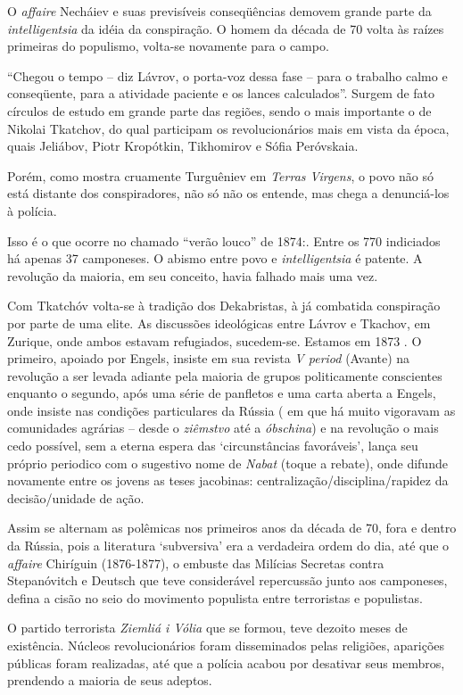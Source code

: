 O \emph{affaire} Necháiev e suas previsíveis conseqüências demovem
grande parte da \emph{intelligentsia} da idéia da conspiração. O homem
da década de 70 volta às raízes primeiras do populismo, volta-se
novamente para o campo.

``Chegou o tempo -- diz Lávrov, o porta-voz dessa fase -- para o
trabalho calmo e conseqüente, para a atividade paciente e os lances
calculados''. Surgem de fato círculos de estudo em grande parte das
regiões, sendo o mais importante o de Nikolai Tkatchov, do qual
participam os revolucionários mais em vista da época, quais Jeliábov,
Piotr Kropótkin, Tikhomirov e Sófia Peróvskaia.

Porém, como mostra cruamente Turguêniev em \emph{Terras Virgens}, o povo
não só está distante dos conspiradores, não só não os entende, mas chega
a denunciá-los à polícia.

Isso é o que ocorre no chamado ``verão louco'' de 1874:. Entre os 770
indiciados há apenas 37 camponeses. O abismo entre povo e
\emph{intelligentsia} é patente. A revolução da maioria, em seu
conceito, havia falhado mais uma vez.

Com Tkatchóv volta-se à tradição dos Dekabristas, à já combatida
conspiração por parte de uma elite. As discussões ideológicas entre
Lávrov e Tkachov, em Zurique, onde ambos estavam refugiados, sucedem-se.
Estamos em 1873 . O primeiro, apoiado por Engels, insiste em sua revista
\emph{V period} (Avante) na revolução a ser levada adiante pela maioria
de grupos politicamente conscientes enquanto o segundo, após uma série
de panfletos e uma carta aberta a Engels, onde insiste nas condições
particulares da Rússia ( em que há muito vigoravam as comunidades
agrárias -- desde o \emph{ziêmstvo} até a \emph{óbschina}) e na
revolução o mais cedo possível, sem a eterna espera das `circunstâncias
favoráveis', lança seu próprio periodico com o sugestivo nome de
\emph{Nabat} (toque a rebate), onde difunde novamente entre os jovens as
teses jacobinas: centralização/disciplina/rapidez da decisão/unidade de
ação.

Assim se alternam as polêmicas nos primeiros anos da década de 70, fora
e dentro da Rússia, pois a literatura `subversiva' era a verdadeira
ordem do dia, até que o \emph{affaire} Chiríguin (1876-1877), o embuste
das Milícias Secretas contra Stepanóvitch e Deutsch que teve
considerável repercussão junto aos camponeses, defina a cisão no seio do
movimento populista entre terroristas e populistas.

O partido terrorista \emph{Ziemliá i Vólia} que se formou, teve dezoito
meses de existência. Núcleos revolucionários foram disseminados pelas
religiões, aparições públicas foram realizadas, até que a polícia acabou
por desativar seus membros, prendendo a maioria de seus adeptos.

